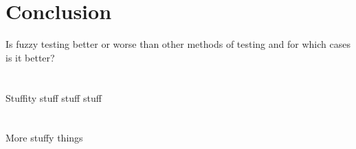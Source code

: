 \documentclass[10pt, final, journal, letterpaper, twoside, twocolumn]{IEEEtran}
\begin{document}
\section{Conclusion}
	Is fuzzy testing better or worse than other methods of testing and for which cases is it better?

\pagebreak
	
\appendices
	\section{}
		Stuffity stuff stuff stuff
	\section{}
		More stuffy things
	
\newpage
\nocite{*}


\end{document}
